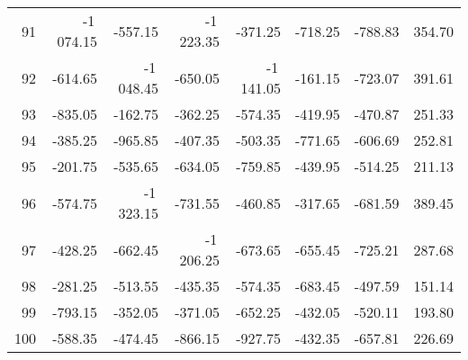 \begin{longtable}{rrrrrrrr}
91 & -1\,074.15 & -557.15 & -1\,223.35 & -371.25 & -718.25 & -788.83 & 354.70  \\
92 & -614.65 & -1\,048.45 & -650.05 & -1\,141.05 & -161.15 & -723.07 & 391.61  \\
93 & -835.05 & -162.75 & -362.25 & -574.35 & -419.95 & -470.87 & 251.33  \\
94 & -385.25 & -965.85 & -407.35 & -503.35 & -771.65 & -606.69 & 252.81  \\
95 & -201.75 & -535.65 & -634.05 & -759.85 & -439.95 & -514.25 & 211.13  \\
96 & -574.75 & -1\,323.15 & -731.55 & -460.85 & -317.65 & -681.59 & 389.45  \\
97 & -428.25 & -662.45 & -1\,206.25 & -673.65 & -655.45 & -725.21 & 287.68  \\
98 & -281.25 & -513.55 & -435.35 & -574.35 & -683.45 & -497.59 & 151.14  \\
99 & -793.15 & -352.05 & -371.05 & -652.25 & -432.05 & -520.11 & 193.80  \\
100 & -588.35 & -474.45 & -866.15 & -927.75 & -432.35 & -657.81 & 226.69  \\

\end{longtable}


